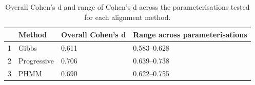 \begin{table}[ht]
\centering
\begin{tabular}{rlll}
  \hline
 & Method & Overall Cohen's d & Range across parameterisations \\ 
  \hline
1 & Gibbs & 0.611 & 0.583--0.628 \\ 
  2 & Progressive & 0.706 & 0.639--0.738 \\ 
  3 & PHMM & 0.690 & 0.622--0.755 \\ 
   \hline
\end{tabular}
\caption{Overall Cohen's d and range of Cohen's d across the parameterisations tested for each alignment method.} 
\label{tab:sensitivity_summary}
\end{table}
